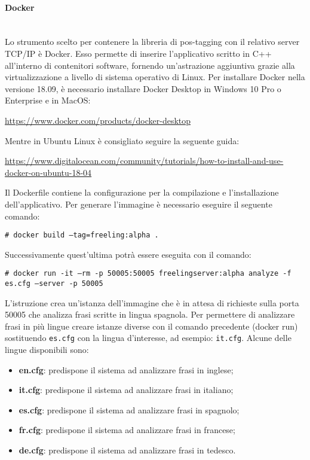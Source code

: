 \paragraph{Docker}\mbox{}\\
Lo strumento scelto per contenere la libreria di pos-tagging con il relativo server {TCP/IP} è Docker. Esso permette di inserire l'applicativo scritto in {C++} all'interno di contenitori software, fornendo un'astrazione aggiuntiva grazie alla virtualizzazione a livello di sistema operativo di Linux.
Per installare Docker nella versione 18.09, è necessario installare Docker Desktop in Windows 10 Pro o Enterprise e in MacOS:
\begin{center}
\url{https://www.docker.com/products/docker-desktop}
\end{center}
Mentre in Ubuntu Linux è consigliato seguire la seguente guida: 
\begin{flushleft}
	\url{https://www.digitalocean.com/community/tutorials/how-to-install-and-use-docker-on-ubuntu-18-04}
\end{flushleft}
Il Dockerfile contiene la configurazione per la compilazione e l'installazione dell'applicativo. 
Per generare l'immagine è necessario eseguire il seguente comando:
\begin{center}
	\texttt{\# docker build --tag=freeling:alpha .}
\end{center}
Successivamente quest'ultima potrà essere eseguita con il comando:	
\begin{center}
	\texttt{\# docker run -it --rm -p 50005:50005 freelingserver:alpha analyze -f es.cfg --server -p 50005}
\end{center}
L'istruzione crea un'istanza dell'immagine che è in attesa di richieste sulla porta 50005 che analizza frasi scritte in lingua spagnola.
Per permettere di analizzare frasi in più lingue creare istanze diverse con il comando precedente (docker run) sostituendo \texttt{es.cfg} con la lingua d'interesse, ad esempio: \texttt{it.cfg}. Alcune delle lingue disponibili sono: 
\begin{itemize}
	\item \textbf{en.cfg}: predispone il sistema ad analizzare frasi in inglese;
	\item \textbf{it.cfg}: predispone il sistema ad analizzare frasi in italiano;
	\item \textbf{es.cfg}: predispone il sistema ad analizzare frasi in spagnolo;
	\item \textbf{fr.cfg}: predispone il sistema ad analizzare frasi in francese;
	\item \textbf{de.cfg}: predispone il sistema ad
	analizzare frasi in tedesco.
\end{itemize}

